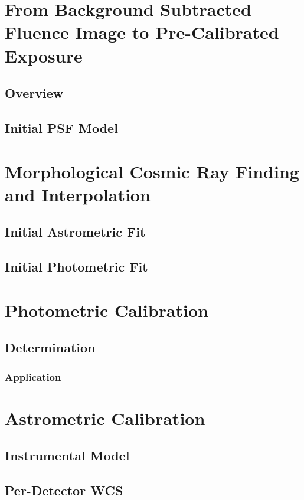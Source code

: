 \section{From Background Subtracted Fluence Image to Pre-Calibrated Exposure}

\subsection{Overview}

\subsection{Initial PSF Model}

\section{Morphological Cosmic Ray Finding and Interpolation}

\subsection{Initial Astrometric Fit}

\subsection{Initial Photometric Fit}

\section{Photometric Calibration}

\subsection{Determination}

\subsubsection{Application}



\section{Astrometric Calibration}

\subsection{Instrumental Model}

\subsection{Per-Detector WCS}



	